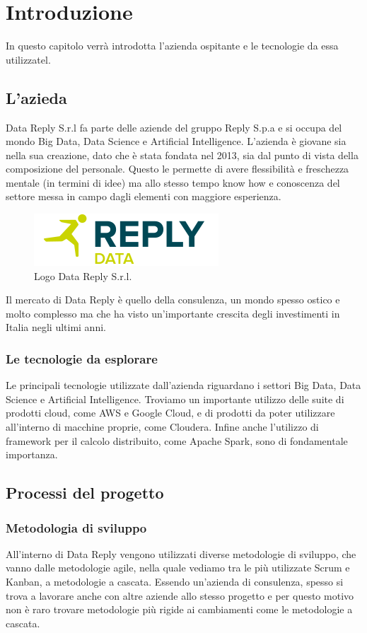 \chapter{Introduzione}
\label{Introduzione}
In questo capitolo verrà introdotta l'azienda ospitante e le tecnologie da essa utilizzatel.
\section{L'azieda}
Data Reply S.r.l fa parte delle aziende del gruppo Reply S.p.a e si occupa del mondo Big Data, Data Science e Artificial Intelligence. L'azienda è giovane sia nella sua creazione, dato che è stata fondata nel 2013, sia dal punto di vista della composizione del personale. Questo le permette di avere flessibilità e freschezza mentale (in termini di idee) ma allo stesso tempo know how e conoscenza del settore messa in campo dagli elementi con maggiore esperienza.

\begin{figure}
	\centering
	\includegraphics[scale=2]{figures/data-reply-logo}
	\caption[Logo Data Reply S.r.l.]{Logo Data Reply S.r.l.
		\label{fig:logoDataReply}}
\end{figure}

Il mercato di Data Reply è quello della consulenza, un mondo spesso ostico e molto complesso ma che ha visto un'importante crescita degli investimenti in Italia negli ultimi anni.
\subsection{Le tecnologie da esplorare}
Le principali tecnologie utilizzate dall'azienda riguardano i settori Big Data, Data Science e Artificial Intelligence. Troviamo un importante utilizzo delle suite di prodotti cloud, come \gls{AWS} e \gls{Google Cloud}, e di prodotti da poter utilizzare all'interno di macchine proprie, come \gls{Cloudera}. Infine anche l'utilizzo di framework per il calcolo distribuito, come \gls{Apache Spark}, sono di fondamentale importanza.
\section{Processi del progetto}
\subsection{Metodologia di sviluppo}
All'interno di Data Reply vengono utilizzati diverse metodologie di sviluppo, che vanno dalle metodologie agile, nella quale vediamo tra le più utilizzate \gls{Scrum} e \gls{Kanban}, a metodologie a cascata. Essendo un'azienda di consulenza, spesso si trova a lavorare anche con altre aziende allo stesso progetto e per questo motivo non è raro trovare metodologie più rigide ai cambiamenti come le metodologie a cascata.
